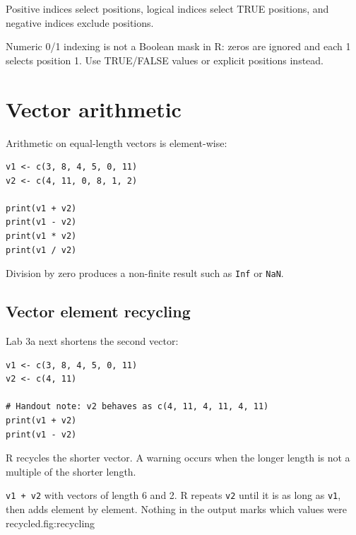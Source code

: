 Positive indices select positions, logical indices select TRUE positions, and negative indices exclude positions.

\begin{pitfall}
Numeric 0/1 indexing is not a Boolean mask in R: zeros are ignored and each 1 selects position 1. Use TRUE/FALSE values or explicit positions instead.
\end{pitfall}

\section{Vector arithmetic}

Arithmetic on equal-length vectors is element-wise:

\begin{lstlisting}[style=dsr]
v1 <- c(3, 8, 4, 5, 0, 11)
v2 <- c(4, 11, 0, 8, 1, 2)

print(v1 + v2)
print(v1 - v2)
print(v1 * v2)
print(v1 / v2)
\end{lstlisting}

Division by zero produces a non-finite result such as \texttt{Inf} or \texttt{NaN}.

\subsection{Vector element recycling}

Lab 3a next shortens the second vector:

\begin{lstlisting}[style=dsr]
v1 <- c(3, 8, 4, 5, 0, 11)
v2 <- c(4, 11)

# Handout note: v2 behaves as c(4, 11, 4, 11, 4, 11)
print(v1 + v2)
print(v1 - v2)
\end{lstlisting}

R recycles the shorter vector. A warning occurs when the longer length is not a multiple of the shorter length.

\begin{utpfig}[Recycling]{\texttt{v1 + v2} with vectors of length 6 and 2. R
repeats \texttt{v2} until it is as long as \texttt{v1}, then adds element by
element. Nothing in the output marks which values were recycled.}{fig:recycling}
\end{utpfig}

